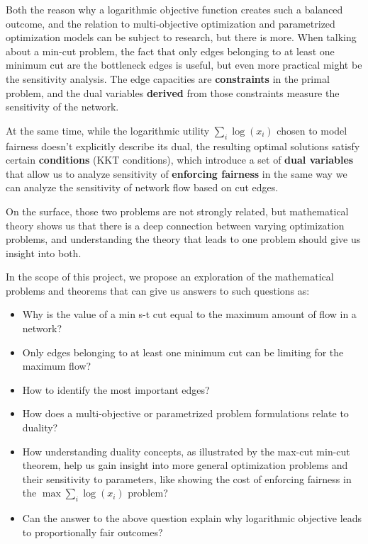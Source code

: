 \documentclass[12pt, openany]{article}
\begin{document}
Both the reason why a logarithmic objective function creates such a balanced outcome, and the relation to multi-objective optimization and parametrized optimization models can be subject to research, but there is more. When talking about a min-cut problem, the fact that only edges belonging to at least one minimum cut are the bottleneck edges is useful, but even more practical might be the sensitivity analysis. The edge capacities are \textbf{constraints} in the primal problem, and the dual variables \textbf{derived} from those constraints measure the sensitivity of the network.

At the same time, while the logarithmic utility \( \sum_{i} \log(x_i) \) chosen to model fairness doesn't explicitly describe its dual, the resulting optimal solutions satisfy certain \textbf{conditions} (KKT conditions), which introduce a set of \textbf{dual variables} that allow us to analyze sensitivity of \textbf{enforcing fairness} in the same way we can analyze the sensitivity of network flow based on cut edges.

On the surface, those two problems are not strongly related, but mathematical theory shows us that there is a deep connection between varying optimization problems, and understanding the theory that leads to one problem should give us insight into both.

In the scope of this project, we propose an exploration of the mathematical problems and theorems that can give us answers to such questions as:
\begin{itemize}
    \item Why is the value of a min s-t cut equal to the maximum amount of flow in a network?
    \item Only edges belonging to at least one minimum cut can be limiting for the maximum flow?
    \item How to identify the most important edges?
    \item How does a multi-objective or parametrized problem formulations relate to duality?
    \item How understanding duality concepts, as illustrated by the max-cut min-cut theorem, help us gain insight into more general optimization problems and their sensitivity to parameters, like showing the cost of enforcing fairness in the \( \max \sum_{i} \log(x_i) \) problem?
    \item Can the answer to the above question explain why logarithmic objective leads to proportionally fair outcomes?
\end{itemize}
\end{document}
